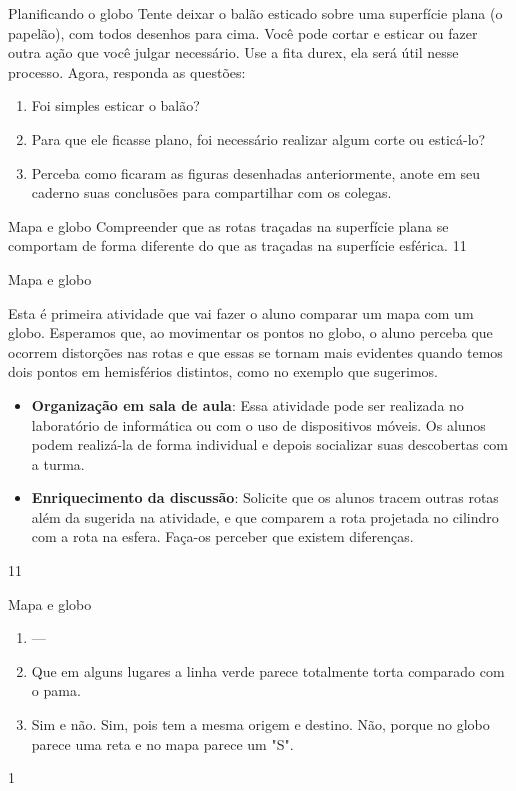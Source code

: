 \begin{task}{Planificando o globo}
Tente deixar o balão esticado sobre uma superfície plana (o papelão), com todos desenhos para cima. Você pode cortar e esticar ou fazer outra ação que você julgar necessário. Use a  fita durex, ela será  útil nesse processo.
Agora, responda as questões:
\begin{enumerate}
\item Foi simples esticar o balão?
\item Para que ele ficasse plano, foi necessário realizar algum corte ou esticá-lo?
\item Perceba como ficaram as figuras desenhadas anteriormente, anote em seu caderno suas conclusões para compartilhar com os colegas.
\end{enumerate}

\end{task}

\clearpage

\begin{objectives}{Mapa e globo}
{
Compreender que as rotas traçadas na superfície plana se comportam de forma diferente do que as traçadas na superfície esférica.
}{1}{1}
\end{objectives}

\begin{sugestions}{Mapa e globo}
{
  Esta é primeira atividade que vai fazer o aluno comparar um mapa com um globo. Esperamos que, ao movimentar os pontos no globo, o aluno perceba que ocorrem distorções nas rotas e que essas se tornam mais evidentes quando temos dois pontos em hemisférios distintos, como no exemplo que sugerimos.

  \begin{itemize}
  \item \textbf{Organização em sala de aula}: Essa atividade pode ser realizada no laboratório de informática ou com o uso de dispositivos móveis. Os alunos podem realizá-la de forma individual e depois socializar suas descobertas com a turma.
  \item \textbf{Enriquecimento da discussão}: Solicite que os alunos tracem outras rotas além da sugerida na atividade, e que comparem a rota projetada no cilindro com a rota na esfera. Faça-os perceber que existem diferenças.
  \end{itemize}
}{1}{1}
\end{sugestions}
\begin{answer}{Mapa e globo}
{
  \begin{enumerate}
  \item ---
  \item Que em alguns lugares a linha verde parece totalmente torta comparado com o pama.
  \item Sim e não. Sim, pois tem a mesma origem e destino. Não, porque no globo parece uma reta e no mapa parece um "S".
  \end{enumerate}
}{1}
\end{answer}

